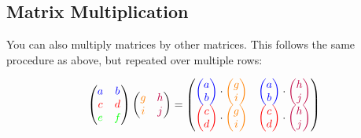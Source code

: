 \documentclass[a4paper,openany,11pt]{book}
\begin{document}
				\subsection{Matrix Multiplication}

					You can also multiply matrices by other matrices. This follows the same procedure as above, but repeated over multiple rows:

					\begin{equation}
						\begin{pmatrix}
							\color{blue} a & \color{blue} b 
							\\
							\color{red} c & \color{red} d
							\\
							\color{green} e & \color{green} f
						\end{pmatrix} \begin{pmatrix}
							\color{orange} g & \color{purple} h 
							\\
							\color{orange} i & \color{purple} j
						\end{pmatrix}  = \begin{pmatrix}
							{\color{blue} \begin{pmatrix} a \\ b \end{pmatrix}} \cdot {\color{orange}\begin{pmatrix} g \\ i \end{pmatrix}} & {\color{blue} \begin{pmatrix} a \\ b \end{pmatrix}} \cdot {\color{purple}\begin{pmatrix} h \\ j \end{pmatrix}}
							\\
							{\color{red} \begin{pmatrix} c \\ d \end{pmatrix}} \cdot {\color{orange}\begin{pmatrix} g \\ i \end{pmatrix}} & {\color{red} \begin{pmatrix} c \\ d \end{pmatrix}} \cdot {\color{purple}\begin{pmatrix} h \\ j \end{pmatrix}}
							\\

\end{pmatrix}
\end{equation}
\end{document}
